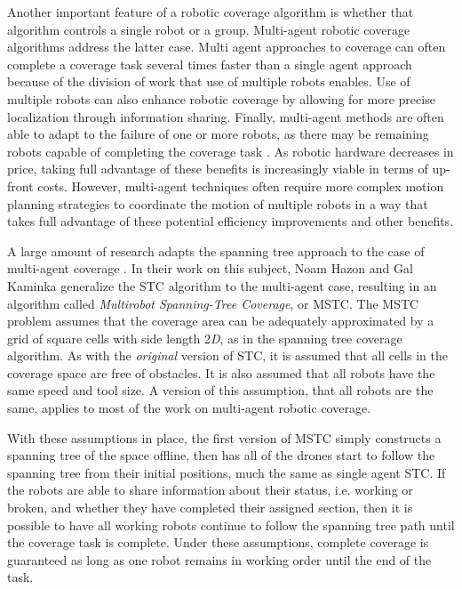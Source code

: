 Another important feature of a robotic coverage algorithm is whether that algorithm controls a single robot or a group. Multi-agent robotic coverage algorithms address the latter case. Multi agent approaches to coverage can often complete a coverage task several times faster than a single agent approach because of the division of work that use of multiple robots enables. Use of multiple robots can also enhance robotic coverage by allowing for more precise localization through information sharing. Finally, multi-agent methods are often able to adapt to the failure of one or more robots, as there may be remaining robots capable of completing the coverage task \cite{Choset}. As robotic hardware decreases in price, taking full advantage of these benefits is increasingly viable in terms of up-front costs. However, multi-agent techniques often require more complex motion planning strategies to coordinate the motion of multiple robots in a way that takes full advantage of these potential efficiency improvements and other benefits.


A large amount of research adapts the spanning tree approach to the case of multi-agent coverage \cite{Zheng}\cite{Hazon}. In their work on this subject, Noam Hazon and Gal Kaminka generalize the STC algorithm to the multi-agent case, resulting in an algorithm called \textit{Multirobot Spanning-Tree Coverage}, or MSTC. The MSTC problem assumes that the coverage area can be adequately approximated by a grid of square cells with side length 2\textit{D}, as in the spanning tree coverage algorithm. As with the \textit{original} version of STC, it is assumed that all cells in the coverage space are free of obstacles. It is also assumed that all robots have the same speed and tool size. A version of this assumption, that all robots are the same, applies to most of the work on multi-agent robotic coverage.


With these assumptions in place, the first version of MSTC simply constructs a spanning tree of the space offline, then has all of the drones start to follow the spanning tree from their initial positions, much the same as single agent STC. If the robots are able to share information about their status, i.e. working or broken, and whether they have completed their assigned section, then it is possible to have all working robots continue to follow the spanning tree path until the coverage task is complete. Under these assumptions, complete coverage is guaranteed as long as one robot remains in working order until the end of the task.

